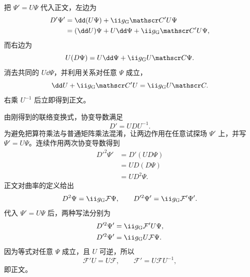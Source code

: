 \begin{derivation}
把 $\Psi'=U\Psi$ 代入正文，左边为
\begin{align*}
 D'\Psi'
 &=\dd(U\Psi)+\ii g_{\rm G}\mathscr C'U\Psi\\
 &=(\dd U)\Psi+U\dd\Psi+\ii g_{\rm G}\mathscr C'U\Psi,
\end{align*}
而右边为
\begin{equation*}
 U(D\Psi)=U\dd\Psi+\ii g_{\rm G}U\mathscr C\Psi.
\end{equation*}
消去共同的 $U\dd\Psi$，并利用关系对任意 $\Psi$ 成立，
\begin{equation*}
 \dd U+\ii g_{\rm G}\mathscr C'U=\ii g_{\rm G}U\mathscr C.
\end{equation*}
右乘 $U^{-1}$ 后立即得到正文。

由刚得到的联络变换式，协变导数满足
\[
D'=UDU^{-1}.
\]
为避免把算符乘法与普通矩阵乘法混淆，让两边作用在任意试探场 $\Psi'$ 上，并写 $\Psi'=U\Psi$。连续作用两次协变导数得到
\begin{align*}
D'^2\Psi'
&=D'\!\left(U D\Psi\right)\\
&=U D(D\Psi)\\
&=U D^2\Psi.
\end{align*}
正文对曲率的定义给出
\[
D^2\Psi=\ii g_{\rm G}\mathcal F\Psi,
\qquad
D'^2\Psi'=\ii g_{\rm G}\mathcal F'\Psi'.
\]
代入 $\Psi'=U\Psi$ 后，两种写法分别为
\begin{align*}
D'^2\Psi'
&=\ii g_{\rm G}\mathcal F' U\Psi,\\
D'^2\Psi'
&=\ii g_{\rm G}U\mathcal F\Psi.
\end{align*}
因为等式对任意 $\Psi$ 成立，且 $U$ 可逆，所以
\[
\mathcal F'U=U\mathcal F,
\qquad
\mathcal F'=U\mathcal F U^{-1},
\]
即正文。
\end{derivation}

